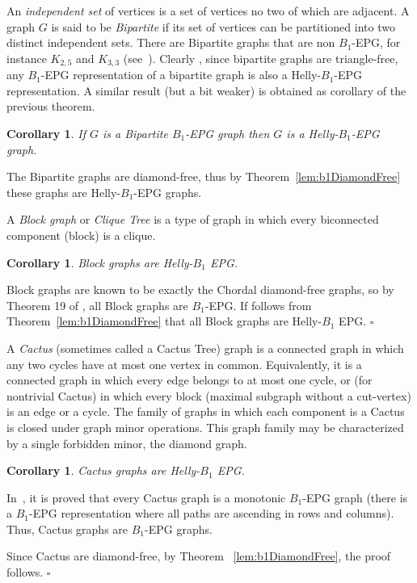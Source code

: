 \documentclass[9pt]{entcs}
\newtheorem{coro}[thm]{Corollary}%
\begin{document}
An \textit{independent set} of vertices is a set of vertices no two of which are adjacent.
A graph $G$ is said to be \textit{Bipartite} if its set of vertices can be partitioned into two distinct independent sets.
 There are Bipartite graphs that are non $B_1$-EPG, for instance $K_{2,5}$ and $K_{3,3}$ (see~\cite{cohen2014}). Clearly , since
 bipartite graphs are triangle-free, any $B_1$-EPG representation of a bipartite graph is also a Helly-$B_1$-EPG representation.
 A similar result (but a bit weaker) is obtained as corollary of the previous theorem. 


\begin{coro}
If $G$ is a Bipartite $B_1$-EPG graph then $G$ is a Helly-$B_1$-EPG graph.
\end{coro}

\begin{pf}
The Bipartite graphs are diamond-free, thus by Theorem~\ref{lem:b1DiamondFree} these graphs are Helly-$B_1$-EPG graphs.
\end{pf}

A \textit{Block graph} or \textit{Clique Tree} is a type of graph in which every biconnected component (block) is a clique.

\begin{coro}\label{lem:cdf}
 Block graphs are Helly-$B_1$ EPG.
\end{coro}

\begin{pf}
Block graphs are known to be exactly the Chordal diamond-free graphs, so by   Theorem 19 of \cite{ries2009}, all Block graphs are  $B_1$-EPG. If follows from Theorem~\ref{lem:b1DiamondFree} that all Block graphs are Helly-$B_1$ EPG. 
 \hfill $\square$\end{pf} 

A \textit{Cactus} (sometimes called a Cactus Tree)  graph is a connected graph in which any two  cycles have at most one vertex in common. Equivalently, it is a connected graph in which every edge belongs to at most one  cycle, or (for nontrivial Cactus) in which every block (maximal subgraph without a cut-vertex) is an edge or a cycle. The family of graphs in which each component is a Cactus is closed under graph minor operations. This graph family may be characterized by a single forbidden minor, the diamond graph.
 
\begin{coro}
Cactus graphs are  Helly-$B_1$ EPG.
\end{coro}
\begin{pf}
In~\cite{cela2019monotonic}, it is proved that every Cactus graph is a monotonic $B_1$-EPG graph 
(there is a $B_1$-EPG representation where all paths are ascending in rows and columns). 
Thus, Cactus graphs are $B_1$-EPG graphs. 

Since Cactus are diamond-free, by Theorem ~\ref{lem:b1DiamondFree}, the proof follows.
\hfill  $\square$\end{pf}
\end{document}
